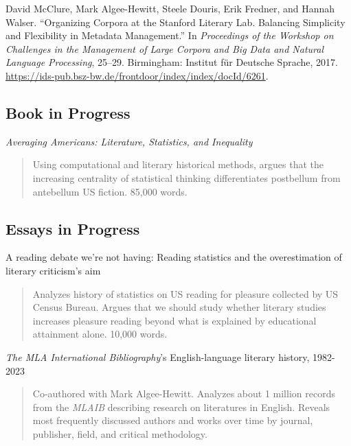\documentclass[
  12pt,
  letterpaper,
]{article}
\newlength{\cslhangindent}
\newlength{\cslentryspacingunit} %
\newenvironment{CSLReferences}[2] %
 {%
  \setlength{\parindent}{0pt}
  \ifodd #1
  \let\oldpar\par
  \def\par{\hangindent=\cslhangindent\oldpar}
  \fi
  \setlength{\parskip}{#2\cslentryspacingunit}
 }%
 {}
\begin{document}
\begin{CSLReferences}{1}{0}
\leavevmode{}%
David McClure, Mark Algee-Hewitt, Steele Douris, Erik Fredner, and
Hannah Walser. {``Organizing Corpora at the {Stanford Literary Lab}.
{Balancing} Simplicity and Flexibility in Metadata Management.''} In
\emph{Proceedings of the {Workshop} on {Challenges} in the {Management}
of {Large Corpora} and {Big Data} and {Natural Language Processing}},
25--29. {Birmingham}: {Institut für Deutsche Sprache}, 2017.
\url{https://ids-pub.bsz-bw.de/frontdoor/index/index/docId/6261}.

\end{CSLReferences}

\hypertarget{book}{%
\subsection{Book in Progress}\label{book}}

\emph{Averaging Americans: Literature, Statistics, and Inequality}\\
\vspace{-1.5\baselineskip}
\begin{quote}
  Using computational and literary historical methods, argues that the increasing centrality of statistical thinking differentiates postbellum from antebellum US fiction. 85,000 words.
\end{quote}

\hypertarget{wip}{%
\subsection{Essays in Progress}\label{wip}}

A reading debate we're not having: Reading statistics and the overestimation of literary criticism's aim\\
\vspace{-1.5\baselineskip}
\begin{quote}
  Analyzes history of statistics on US reading for pleasure collected by US Census Bureau. Argues that we should study whether literary studies increases pleasure reading beyond what is explained by educational attainment alone. 10,000 words.
\end{quote}

\emph{The MLA International Bibliography}'s English-language literary history, 1982-2023\\
\vspace{-1.5\baselineskip}
\begin{quote}
  Co-authored with Mark Algee-Hewitt. Analyzes about 1 million records from the \emph{MLAIB} describing research on literatures in English. Reveals most frequently discussed authors and works over time by journal, publisher, field, and critical methodology.
\end{quote}
\end{document}
